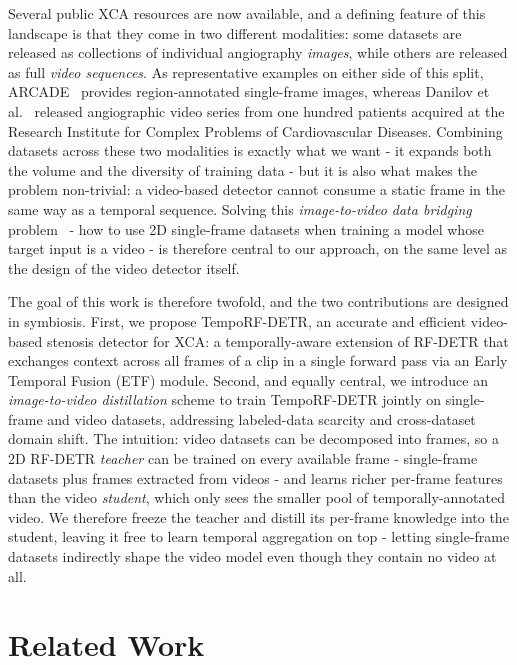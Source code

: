 \documentclass[conference]{IEEEtran}
\begin{document}
Several public XCA resources are now available, and a defining feature of this landscape is that they come in two different modalities: some datasets are released as collections of individual angiography \emph{images}, while others are released as full \emph{video sequences}. As representative examples on either side of this split, ARCADE~\cite{popov2024arcade} provides region-annotated single-frame images, whereas Danilov et al.~\cite{Danilov2021} released angiographic video series from one hundred patients acquired at the Research Institute for Complex Problems of Cardiovascular Diseases. Combining datasets across these two modalities is exactly what we want - it expands both the volume and the diversity of training data - but it is also what makes the problem non-trivial: a video-based detector cannot consume a static frame in the same way as a temporal sequence. Solving this \emph{image-to-video data bridging} problem~\cite{li2025imagetovideo} - how to use 2D single-frame datasets when training a model whose target input is a video - is therefore central to our approach, on the same level as the design of the video detector itself.

The goal of this work is therefore twofold, and the two contributions are designed in symbiosis. First, we propose \mbox{TempoRF-DETR}, an accurate and efficient video-based stenosis detector for XCA: a temporally-aware extension of RF-DETR that exchanges context across all frames of a clip in a single forward pass via an Early Temporal Fusion (ETF) module. Second, and equally central, we introduce an \emph{image-to-video distillation} scheme to train \mbox{TempoRF-DETR} jointly on single-frame and video datasets, addressing labeled-data scarcity and cross-dataset domain shift. The intuition: video datasets can be decomposed into frames, so a 2D RF-DETR \emph{teacher} can be trained on every available frame - single-frame datasets plus frames extracted from videos - and learns richer per-frame features than the video \emph{student}, which only sees the smaller pool of temporally-annotated video. We therefore freeze the teacher and distill its per-frame knowledge into the student, leaving it free to learn temporal aggregation on top - letting single-frame datasets indirectly shape the video model even though they contain no video at all.
\section{Related Work}
\end{document}
